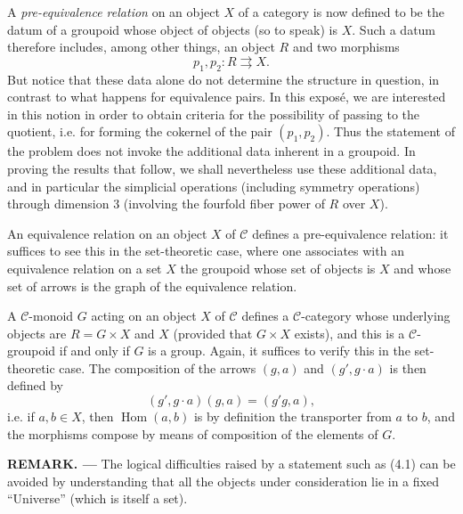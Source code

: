 A \emph{pre-equivalence relation} on an object $X$ of a category is now
defined to be the datum of a groupoid whose object of objects (so to speak) is
$X$. Such a datum therefore includes, among other things, an object $R$ and
two morphisms
\[
  p_1,p_2:R\rightrightarrows X.
\]
But notice that these data alone do not determine the structure in question,
in contrast to what happens for equivalence pairs. In this exposé, we are
interested in this notion in order to obtain criteria for the possibility of
passing to the quotient, i.e. for forming the cokernel of the pair
$(p_1,p_2)$. Thus the statement of the problem does not invoke the additional
data inherent in a groupoid. In proving the results that follow, we shall
nevertheless use these additional data, and in particular the simplicial
operations (including symmetry operations) through dimension $3$ (involving
the fourfold fiber power of $R$ over $X$).

An equivalence relation on an object $X$ of $\mathcal C$ defines a
pre-equivalence relation: it suffices to see this in the set-theoretic case,
where one associates with an equivalence relation on a set $X$ the groupoid
whose set of objects is $X$ and whose set of arrows is the graph of the
equivalence relation.

A $\mathcal C$-monoid $G$ acting on an object $X$ of $\mathcal C$ defines a
$\mathcal C$-category whose underlying objects are $R=G\times X$ and $X$
(provided that $G\times X$ exists), and this is a $\mathcal C$-groupoid if and
only if $G$ is a group. Again, it suffices to verify this in the set-theoretic
case. The composition of the arrows $(g,a)$ and $(g',g\cdot a)$ is then
defined by
\[
  (g',g\cdot a)(g,a)=(g'g,a),
\]
i.e. if $a,b\in X$, then $\operatorname{Hom}(a,b)$ is by definition the
transporter from $a$ to $b$, and the morphisms compose by means of composition
of the elements of $G$.

\medskip
\noindent\textbf{REMARK. ---} The logical difficulties raised by a statement
such as (4.1) can be avoided by understanding that all the objects under
consideration lie in a fixed ``Universe'' (which is itself a set).


